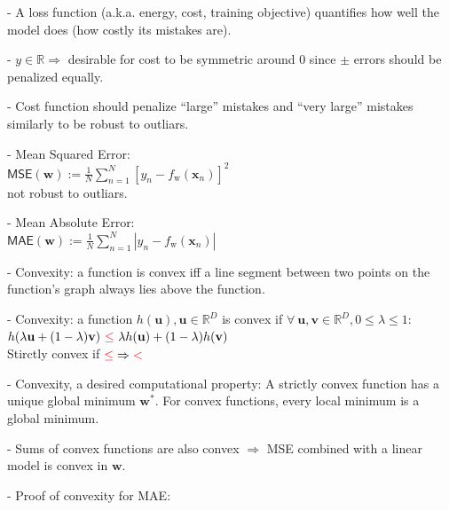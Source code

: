 - A loss function (a.k.a. energy, cost, training objective) quantifies how well the model does (how costly its mistakes are).

- $y \in \mathbb{R} \Rightarrow$ desirable for cost to be symmetric around 0 since $\pm$ errors should be penalized equally.

- Cost function should penalize “large” mistakes and “very large” mistakes similarly to be robust to outliars.

- Mean Squared Error: \\ ${\mathsf{MSE}}(\mathbf{w}):={\frac{1}{N}}\sum_{n=1}^{N}\left[y_{n}-f_{\mathrm{w}}(\mathbf{x}_{n})\right]^{2}$ \\ not robust to outliars.

- Mean Absolute Error: \\ ${\mathsf{MAE}}(\mathbf{w}):={\frac{1}{N}}\sum_{n=1}^{N}|y_{n}-f_{\mathrm{w}}(\mathbf{x}_{n})|$

- Convexity: a function is convex iff a line segment between two points on the function’s graph always lies above the function.

- Convexity: a function $h(\mathbf{u}), \mathbf{u} \in \mathbb{R}^D$ is convex if $\forall \ \mathbf{u}, \mathbf{v} \in \mathbb{R}^D, 0 \leq \lambda \leq  1$: \\ $h(\lambda\mathbf{u}+(1-\lambda)\mathbf{v}) \ \textcolor[RGB]{255,0,0}{\leq} \ \lambda h(\mathbf{u})+(1-\lambda)h(\mathbf{v})$ \\Stirctly convex if $\textcolor[RGB]{255,0,0}{\leq} \Rightarrow \textcolor[RGB]{255,0,0}{<}$ 

- Convexity, a desired computational property:
A strictly convex function has a unique global minimum $\mathbf{w^{*}}$. For convex functions, every local minimum is a global minimum.

- Sums of convex functions are also convex $\Rightarrow$ MSE combined with a linear model is convex in $\mathbf{w}$.

- Proof of convexity for MAE:


